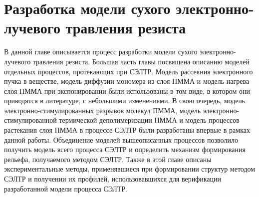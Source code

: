 \chapter{Разработка модели сухого электронно-лучевого травления резиста}

В данной главе описывается процесс разработки модели сухого электронно-лучевого травления резиста. Большая часть главы посвящена описанию моделей отдельных процессов, протекающих при СЭЛТР. Модель рассеяния электронного пучка в веществе, модель диффузии мономера из слоя ПММА и модель нагрева слоя ПММА при экспонировании были использованы в том виде, в котором они приводятся в литературе, с небольшими изменениями. В свою очередь, модель электронно-стимулированных разрывов молекул ПММА, модель электронно-стимулированной термической деполимеризации ПММА и модель процессов растекания слоя ПММА в процессе СЭЛТР были разработаны впервые в рамках данной работы. Объединение моделей вышеописанных процессов позволило получить модель всего процесса СЭЛТР и определить механизм формирования рельефа, получаемого методом СЭЛТР. Также в этой главе описаны экспериментальные методы, применявшиеся при формировании структур методом СЭЛТР и получении их профилей, использовавшихся для верификации разработанной модели процесса СЭЛТР.








